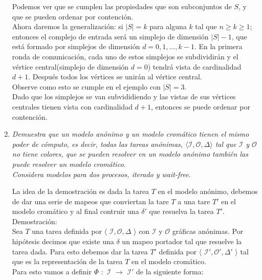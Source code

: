 \documentclass{article}
\begin{document}
\begin{enumerate}
{    Podemos ver que se cumplen las propiedades que son subconjuntos de $S$, y que se pueden ordenar por contención.\\
    Ahora daremos la generalización: si $|S| = k$ para alguna $k$ tal que $n ≥ k ≥ 1$; entonces el complejo de entrada
    será un simplejo de dimensión $|S| - 1$, que está formado por simplejos de dimensión $d = 0, 1, ..., k-1$. En la primera
    ronda de comunicación, cada uno de estos simplejos se subdividirán y el vértice central(simplejo de dimensión $d = 0$) tendrá
    vista de cardinalidad $d + 1$. Después todos los vértices se unirán al vértice central.\\
    Observe como esto se cumple en el ejemplo con $|S| = 3$.\\
    Dado que los simplejos se van subvididiendo y las vistas de sus vértices centrales tienen vista con cardinalidad $d + 1$, entonces
    se puede ordenar por contención.\\
  }
  
\item{
    \textsl{
      Demuestra que un modelo anónimo y un modelo cromático tienen el mismo poder de cómputo, es
      decir, todas las tareas anónimas, $\langle \mathcal{I},\mathcal{O},\Delta \rangle$ tal que
      $\mathcal{I}$ y $\mathcal{O}$ no tiene colores, que se pueden resolver en un modelo anónimo
      también las puede resolver un modelo cromático.\\
      Considera modelos para dos procesos, iterado y wait-free.\\
    }

    La idea de la demostración es dada la tarea $T$ en el modelo anónimo, debemos de dar una serie de mapeos
    que conviertan la tare $T$ a una tare $T'$ en el modelo cromático y al final contruir una $\delta'$ que resuelva
    la tarea $T'$.\\

    Demostración:\\
    Sea $T$ una tarea definida por $\langle$ $\mathcal{I},\mathcal{O},\Delta$ $\rangle$ con $\mathcal{I}$
    y $\mathcal{O}$ gráficas anónimas. Por hipótesis decimos que existe una $\delta$ un mapeo portador
    tal que resuelve la tarea dada.
    Para esto debemos dar la tarea $T'$ definida por $\langle$ $\mathcal{I}',\mathcal{O}',\Delta'$ $\rangle$
    tal que es la representación de la tarea $T$ en el modelo cromático.\\
    Para esto vamos a definir $\Phi$ $:$ $\mathcal{I}$ $\xrightarrow{}$ $\mathcal{I}'$ de la siguiente forma:\\

}
\end{enumerate}
\end{document}

